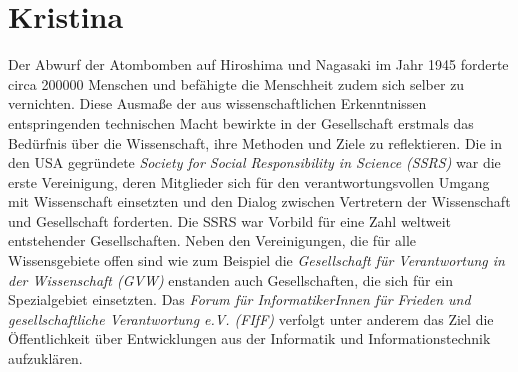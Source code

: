 \documentclass{pmwk}
\begin{document}
\section*{Kristina}
Der Abwurf der Atombomben auf Hiroshima und Nagasaki im Jahr 1945 forderte circa 200000 Menschen und befähigte die Menschheit zudem sich selber zu vernichten. Diese Ausmaße der aus wissenschaftlichen Erkenntnissen entspringenden technischen Macht bewirkte in der Gesellschaft erstmals das Bedürfnis über die Wissenschaft, ihre Methoden und Ziele zu reflektieren. Die in den USA gegründete \textit{Society for Social Responsibility in Science (SSRS)} war die erste Vereinigung, deren Mitglieder sich für den verantwortungsvollen Umgang mit Wissenschaft einsetzten und den Dialog zwischen Vertretern der Wissenschaft und Gesellschaft forderten. Die SSRS war Vorbild für eine Zahl weltweit entstehender Gesellschaften. Neben den Vereinigungen, die für alle Wissensgebiete offen sind wie zum Beispiel die \textit{Gesellschaft für Verantwortung in der Wissenschaft (GVW)} enstanden auch Gesellschaften,  die sich für ein Spezialgebiet einsetzten. Das \textit{Forum für InformatikerInnen für Frieden und gesellschaftliche Verantwortung e.V. (FIfF)} verfolgt unter anderem das Ziel die Öffentlichkeit über Entwicklungen aus der Informatik und Informationstechnik aufzuklären.



\end{document}
